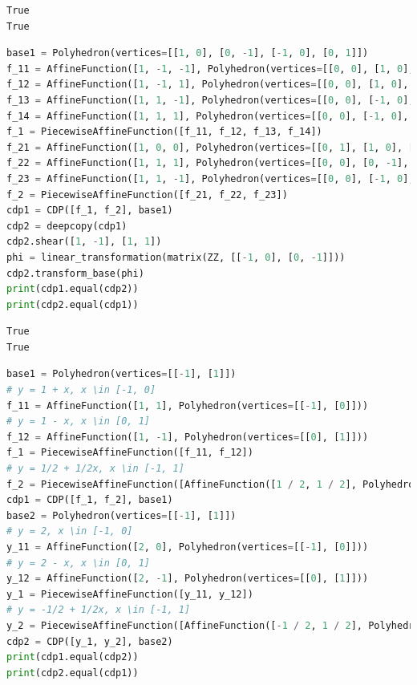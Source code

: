 \documentclass[fontsize=14pt]{scrartcl}
\theoremstyle{definition}
\begin{document}
\begin{lstlisting}[style=output]
True
True
\end{lstlisting}

\begin{lstlisting}[language=Python,style=python]
base1 = Polyhedron(vertices=[[1, 0], [0, -1], [-1, 0], [0, 1]])
f_11 = AffineFunction([1, -1, -1], Polyhedron(vertices=[[0, 0], [1, 0], [0, 1]]))
f_12 = AffineFunction([1, -1, 1], Polyhedron(vertices=[[0, 0], [1, 0], [0, -1]]))
f_13 = AffineFunction([1, 1, -1], Polyhedron(vertices=[[0, 0], [-1, 0], [0, 1]]))
f_14 = AffineFunction([1, 1, 1], Polyhedron(vertices=[[0, 0], [-1, 0], [0, -1]]))
f_1 = PiecewiseAffineFunction([f_11, f_12, f_13, f_14])
f_21 = AffineFunction([1, 0, 0], Polyhedron(vertices=[[0, 1], [1, 0], [0, -1]]))
f_22 = AffineFunction([1, 1, 1], Polyhedron(vertices=[[0, 0], [0, -1], [-1, 0]]))
f_23 = AffineFunction([1, 1, -1], Polyhedron(vertices=[[0, 0], [-1, 0], [0, 1]]))
f_2 = PiecewiseAffineFunction([f_21, f_22, f_23])
cdp1 = CDP([f_1, f_2], base1)
cdp2 = deepcopy(cdp1)
cdp2.shear([1, -1], [1, 1])
phi = linear_transformation(matrix(ZZ, [[-1, 0], [0, -1]]))
cdp2.transform_base(phi)
print(cdp1.equal(cdp2))
print(cdp2.equal(cdp1))
\end{lstlisting}

\begin{lstlisting}[style=output]
True
True
\end{lstlisting}

\begin{lstlisting}[language=Python,style=python]
base1 = Polyhedron(vertices=[[-1], [1]])
# y = 1 + x, x \in [-1, 0]
f_11 = AffineFunction([1, 1], Polyhedron(vertices=[[-1], [0]]))
# y = 1 - x, x \in [0, 1]
f_12 = AffineFunction([1, -1], Polyhedron(vertices=[[0], [1]]))
f_1 = PiecewiseAffineFunction([f_11, f_12])
# y = 1/2 + 1/2x, x \in [-1, 1]
f_2 = PiecewiseAffineFunction([AffineFunction([1 / 2, 1 / 2], Polyhedron(vertices=[[-1], [1]]))])
cdp1 = CDP([f_1, f_2], base1)
base2 = Polyhedron(vertices=[[-1], [1]])
# y = 2, x \in [-1, 0]
y_11 = AffineFunction([2, 0], Polyhedron(vertices=[[-1], [0]]))
# y = 2 - x, x \in [0, 1]
y_12 = AffineFunction([2, -1], Polyhedron(vertices=[[0], [1]]))
y_1 = PiecewiseAffineFunction([y_11, y_12])
# y = -1/2 + 1/2x, x \in [-1, 1]
y_2 = PiecewiseAffineFunction([AffineFunction([-1 / 2, 1 / 2], Polyhedron(vertices=[[-1], [1]]))])
cdp2 = CDP([y_1, y_2], base2)
print(cdp1.equal(cdp2))
print(cdp2.equal(cdp1))
\end{lstlisting}
\end{document}
